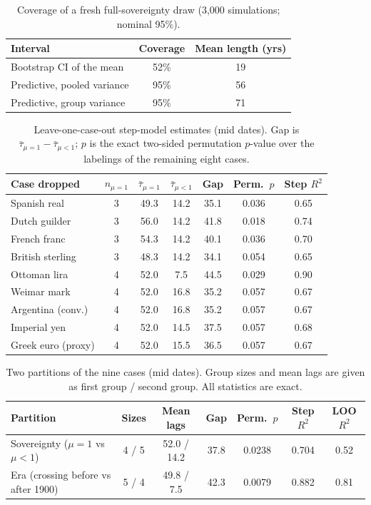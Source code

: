 \documentclass[11pt,letterpaper]{article}
\theoremstyle{definition}
\theoremstyle{plain}
\begin{document}
\begin{table}[H]\centering\small
\caption{Coverage of a fresh full-sovereignty draw (3,000 simulations; nominal 95\%).}\label{tab:cov}
\begin{tabular}{@{}lcc@{}}\toprule
Interval & Coverage & Mean length (yrs)\\\midrule
Bootstrap CI of the mean & 52\% & 19\\
Predictive, pooled variance & 95\% & 56\\
Predictive, group variance & 95\% & 71\\\bottomrule
\end{tabular}
\end{table}

\begin{table}[H]\centering\small
\caption{Leave-one-case-out step-model estimates (mid dates). Gap is $\bar\tau_{\mu=1}-\bar\tau_{\mu<1}$; $p$ is the exact two-sided permutation $p$-value over the labelings of the remaining eight cases.}\label{tab:loco}
\begin{tabular}{@{}lccccc c@{}}\toprule
Case dropped & $n_{\mu=1}$ & $\bar\tau_{\mu=1}$ & $\bar\tau_{\mu<1}$ & Gap & Perm.\ $p$ & Step $R^2$\\\midrule
Spanish real & 3 & 49.3 & 14.2 & 35.1 & 0.036 & 0.65\\
Dutch guilder & 3 & 56.0 & 14.2 & 41.8 & 0.018 & 0.74\\
French franc & 3 & 54.3 & 14.2 & 40.1 & 0.036 & 0.70\\
British sterling & 3 & 48.3 & 14.2 & 34.1 & 0.054 & 0.65\\
Ottoman lira & 4 & 52.0 & 7.5 & 44.5 & 0.029 & 0.90\\
Weimar mark & 4 & 52.0 & 16.8 & 35.2 & 0.057 & 0.67\\
Argentina (conv.) & 4 & 52.0 & 16.8 & 35.2 & 0.057 & 0.67\\
Imperial yen & 4 & 52.0 & 14.5 & 37.5 & 0.057 & 0.68\\
Greek euro (proxy) & 4 & 52.0 & 15.5 & 36.5 & 0.057 & 0.67\\\bottomrule
\end{tabular}
\end{table}

\begin{table}[H]\centering\small
\caption{Two partitions of the nine cases (mid dates). Group sizes and mean lags are given as first group / second group. All statistics are exact.}\label{tab:era}
\begin{tabular}{@{}lcccccc@{}}\toprule
Partition & Sizes & Mean lags & Gap & Perm.\ $p$ & Step $R^2$ & LOO $R^2$\\\midrule
Sovereignty ($\mu=1$ vs $\mu<1$) & 4 / 5 & 52.0 / 14.2 & 37.8 & 0.0238 & 0.704 & 0.52\\
Era (crossing before vs after 1900) & 5 / 4 & 49.8 / 7.5 & 42.3 & 0.0079 & 0.882 & 0.81\\\bottomrule
\end{tabular}
\end{table}
\end{document}
